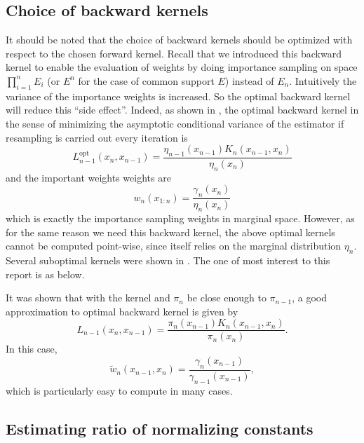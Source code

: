 \subsection{Choice of backward kernels}
\label{sub:Choice of backward kernels}

It should be noted that the choice of backward kernels should be optimized
with respect to the chosen forward kernel. Recall that we introduced this
backward kernel to enable the evaluation of weights by doing importance
sampling on space $\prod_{i=1}^n E_i$ (or $E^n$ for the case of common
support $E$) instead of $E_n$. Intuitively the variance of the importance
weights is increased. So the optimal backward kernel will reduce this ``side
effect''. Indeed, as shown in \textcite{DelMoral2006}, the optimal backward
kernel in the sense of minimizing the asymptotic conditional variance of the
estimator if resampling is carried out every iteration is
\begin{equation}
  L_{n-1}^{\mathrm{opt}}(x_n,x_{n-1})
  = \frac{\eta_{n-1}(x_{n-1})K_n(x_{n-1},x_n)}{\eta_n(x_n)}
\end{equation}
and the important weights weights are
\begin{equation}
  w_n(x_{1:n}) = \frac{\gamma_n(x_n)}{\eta_n(x_n)}
\end{equation}
which is exactly the importance sampling weights in marginal space. However,
as for the same reason we need this backward kernel, the above optimal kernels
cannot be computed point-wise, since itself relies on the marginal
distribution $\eta_n$. Several suboptimal kernels were shown in
\textcite{DelMoral2006}. The one of most interest to this report is as below.

It was shown that with the \mcmc kernel and $\pi_n$ be close enough to
$\pi_{n-1}$, a good approximation to optimal backward kernel is given by
\begin{equation}
  L_{n-1}(x_n,x_{n-1})
  = \frac{\pi_n(x_{n-1})K_n(x_{n-1},x_n)}{\pi_n(x_n)}.
\end{equation}
In this case,
\begin{equation}
  \tilde{w}_n(x_{n-1},x_n)
  = \frac{\gamma_n(x_{n-1})}{\gamma_{n-1}(x_{n-1})},
\end{equation}
which is particularly easy to compute in many cases.

\subsection{Estimating ratio of normalizing constants}
\label{sub:Estimating ratio of normalizing constants}

